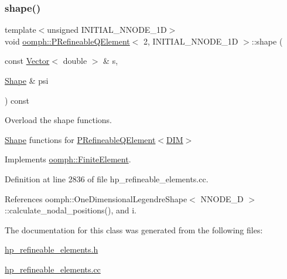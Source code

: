 \subsubsection{\texorpdfstring{shape()}{shape()}}
{\footnotesize\ttfamily template$<$unsigned I\+N\+I\+T\+I\+A\+L\+\_\+\+N\+N\+O\+D\+E\+\_\+1D$>$ \\
void \hyperlink{classoomph_1_1PRefineableQElement}{oomph\+::\+P\+Refineable\+Q\+Element}$<$ 2, I\+N\+I\+T\+I\+A\+L\+\_\+\+N\+N\+O\+D\+E\+\_\+1D $>$\+::shape (\begin{DoxyParamCaption}\item[{const \hyperlink{classoomph_1_1Vector}{Vector}$<$ double $>$ \&}]{s,  }\item[{\hyperlink{classoomph_1_1Shape}{Shape} \&}]{psi }\end{DoxyParamCaption}) const\hspace{0.3cm}{\ttfamily [virtual]}}



Overload the shape functions. 

\hyperlink{classoomph_1_1Shape}{Shape} functions for \hyperlink{classoomph_1_1PRefineableQElement}{P\+Refineable\+Q\+Element$<$\+D\+I\+M$>$} 

Implements \hyperlink{classoomph_1_1FiniteElement_a58a25b6859ddd43b7bfe64a19fee5023}{oomph\+::\+Finite\+Element}.



Definition at line 2836 of file hp\+\_\+refineable\+\_\+elements.\+cc.



References oomph\+::\+One\+Dimensional\+Legendre\+Shape$<$ N\+N\+O\+D\+E\+\_\+D $>$\+::calculate\+\_\+nodal\+\_\+positions(), and i.



The documentation for this class was generated from the following files\+:\begin{DoxyCompactItemize}
\item 
\hyperlink{hp__refineable__elements_8h}{hp\+\_\+refineable\+\_\+elements.\+h}\item 
\hyperlink{hp__refineable__elements_8cc}{hp\+\_\+refineable\+\_\+elements.\+cc}\end{DoxyCompactItemize}
